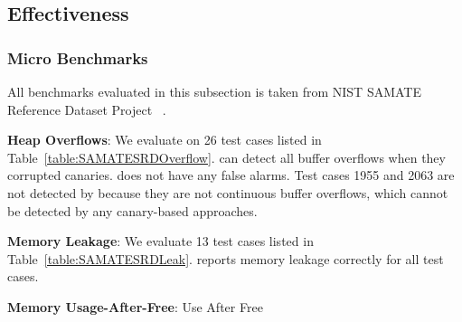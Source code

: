 \subsection{Effectiveness}
\label{sec:effect}

\subsubsection{Micro Benchmarks}
All benchmarks evaluated in this subsection is taken from NIST SAMATE Reference Dataset Project ~\cite{microbenchmarks}.

{\bf Heap Overflows}: We evaluate \doubletake{} on 26 test cases listed in Table~\ref{table:SAMATESRDOverflow}. \doubletake{} can detect all buffer overflows when they corrupted canaries. \doubletake{} does not have any false alarms. Test cases 1955 and 2063 are not detected by \doubletake{} because they are not continuous buffer overflows, which cannot be detected by any canary-based approaches.

{\bf Memory Leakage}: We evaluate 13 test cases listed in Table~\ref{table:SAMATESRDLeak}. \doubletake{} reports memory leakage correctly for all test cases.  

{\bf Memory Usage-After-Free}: 
{Use After Free}
  
